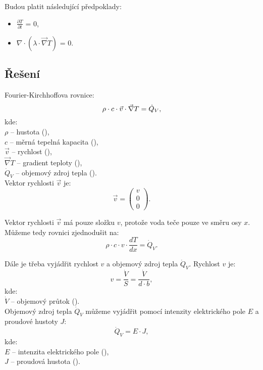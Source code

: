 \documentclass{article}
\begin{document}
Budou platit následující předpoklady:
\begin{itemize}
    \item $\frac{\partial T}{\partial t}$ = 0,
    \item $\nabla \cdot (\lambda \cdot \vec{\nabla} T)$ = 0.
\end{itemize}



\subsection{Řešení}
Fourier-Kirchhoffova rovnice:
\begin{equation}
    \rho \cdot c \cdot \vec{v} \cdot \vec{\nabla} T = \dot{Q}_V,
    \unit{(\ueqWandMinvcu)}
\end{equation}
kde:\\
$\rho$ -- hustota (\ueqKGandMinvcu),\\
$c$ -- měrná tepelná kapacita (\ueqJandKGinvKinv),\\
$\vec{v}$ -- rychlost (\ueqMandSinv),\\
$\vec{\nabla} T$ -- gradient teploty (\ueqKandMinv),\\
$\dot{Q}_V$ -- objemový zdroj tepla (\ueqWandMinvcu).\\

Vektor rychlosti $\vec{v}$ je:
$$
    \vec{v} = \begin{pmatrix} v \\ 0 \\ 0 \end{pmatrix}.
$$

Vektor rychlosti $\vec{v}$ má pouze složku $v$, protože voda teče pouze ve směru osy $x$. Můžeme tedy rovnici zjednodušit na:
$$
    \rho \cdot c \cdot v \cdot \frac{dT}{dx} = \dot{Q}_V.
$$

Dále je třeba vyjádřit rychlost $v$ a objemový zdroj tepla $\dot{Q}_V$. Rychlost $v$ je:
$$
    v = \frac{\dot{V}}{S} = \frac{\dot{V}}{d \cdot b},
$$
kde:\\
$\dot{V}$ -- objemový průtok (\ueqMcuSinv).\\

Objemový zdroj tepla $\dot{Q}_V$ můžeme vyjádřit pomocí intenzity elektrického pole $E$ a proudové hustoty $J$:
$$
    \dot{Q}_V = E \cdot J,
$$
kde:\\
$E$ -- intenzita elektrického pole (\ueqVandMinv),\\
$J$ -- proudová hustota (\ueqAandMinvsq).\\
\end{document}
